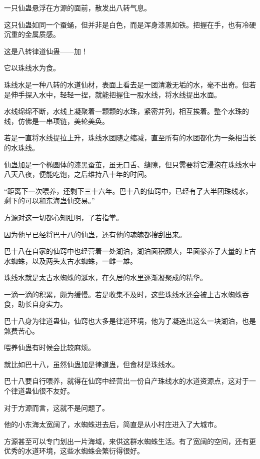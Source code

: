 
\begin{this_body}



一只仙蛊悬浮在方源的面前，散发出八转气息。

这只仙蛊如同一个蚕蛹，但并非是白色，而是浑身漆黑如铁。把握在手，也有冷硬沉重的金属质感。

这是八转律道仙蛊——加！

它以珠线水为食。

珠线水是一种八转的水道仙材，表面上看去是一团清澈无垢的水，毫不出奇。但若是伸手探入水中，轻轻一捏，就能把握住一股水线，将水线提出水面。

水线绵绵不断，水线上凝聚着一颗颗的水珠，紧密并列，相互挨着。整个水珠的线，仿佛是一串项链，美轮美奂。

若是一直将水线提拉上升，珠线水团随之缩减，直至所有的水团都化为一条相当长的水珠线。

仙蛊加是一个椭圆体的漆黑蚕茧，虽无口舌、缝隙，但只需要将它浸泡在珠线水中八天八夜，便能吃饱，之后维持八十年的时间。

“距离下一次喂养，还剩下三十六年。巴十八的仙窍中，已经有了大半团珠线水，剩下的可以和东海蛊仙交易。”

方源对这一切都心知肚明，了若指掌。

因为他早已经将巴十八的仙蛊，还有他的魂魄都搜刮出来。

巴十八在自家的仙窍中也经营着一处湖泊，湖泊面积颇大，里面豢养了大量的上古水蜘蛛，以及两头太古水蜘蛛，一雌一雄。

珠线水就是太古水蜘蛛的涎水，在久居的水里逐渐凝聚成的精华。

一滴一滴的积累，颇为缓慢。若是收集不及时，这些珠线水还会被上古水蜘蛛吞食，助长自身实力。

巴十八身为律道蛊仙，仙窍也大多是律道环境，他为了凝造出这么一块湖泊，也是煞费苦心。

喂养仙蛊有时候会比较麻烦。

就比如巴十八，虽然仙蛊加是律道蛊，但食材是珠线水。

巴十八要自行喂养，就得在仙窍中经营出一份自产珠线水的水道资源点，这对于一个律道蛊仙很不友好。

对于方源而言，这就不是问题了。

他的小东海太宽阔了，水蜘蛛进去后，简直是从小村庄进入了大城市。

方源甚至可以专门划出一片海域，来供这群水蜘蛛生活。有了宽阔的空间，还有更优秀的水道环境，这些水蜘蛛会繁衍得很好。


\end{this_body}
